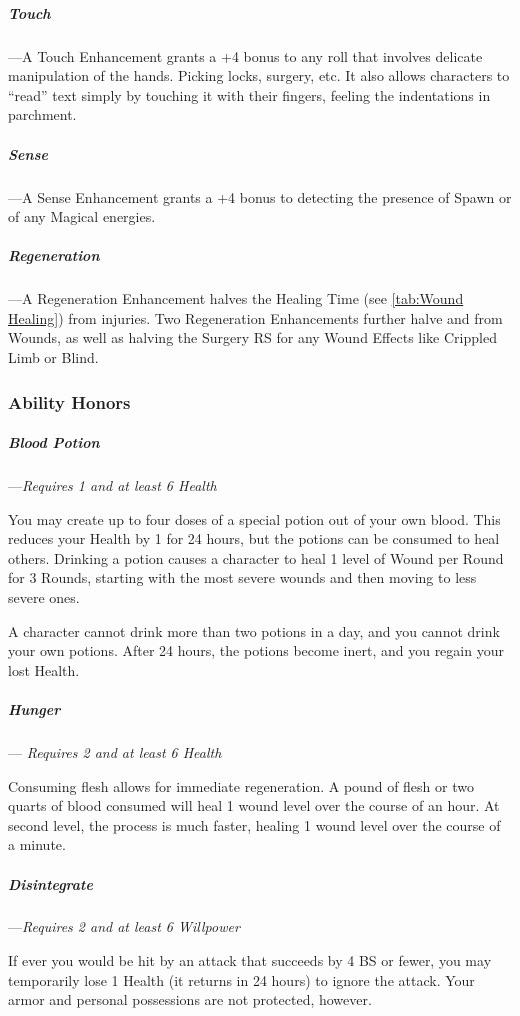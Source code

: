 \documentclass[oneside,11pt,english]{book}
\begin{document}
\subparagraph{Touch}\label{honor:Touch}
---\quad A Touch Enhancement grants a +4 bonus to any roll that involves delicate manipulation 
of the hands. Picking locks, surgery, etc. It also allows characters to “read” text simply by 
touching it with their fingers, feeling the indentations in parchment.

\subparagraph{Sense}\label{honor:Sense}
---\quad A Sense Enhancement grants a +4 bonus to detecting the presence of Spawn or of any 
Magical energies. 

\subparagraph{Regeneration}\label{honor:Regeneration}
---\quad A Regeneration Enhancement halves the Healing Time (see \autoref{tab:Wound Healing}) from injuries. Two 
Regeneration Enhancements further halve  and  from Wounds, as well as 
halving the Surgery RS for any Wound Effects like Crippled Limb or Blind.

\subsubsection{Ability Honors}
\subparagraph{Blood Potion}\label{honor:Blood Potion}
---\quad \emph{Requires  1 and at least 6 Health}

You may create up to four doses
of a special potion out of your own blood. This reduces your Health by 1 for 24 hours, but the 
potions can be consumed to heal others. Drinking a potion causes a character to heal 1 level of 
Wound per Round for 3 Rounds, starting with the most severe wounds and then moving to less 
severe ones. 

A character cannot drink more than two potions in a day, and you cannot drink your own 
potions. After 24 hours, the potions become inert, and you regain your lost Health. 

\subparagraph{Hunger}---\quad\label{honor:Hunger}
\emph{Requires  2 and at least 6 Health}

Consuming flesh allows for immediate regeneration. A pound of flesh or two
quarts of blood consumed will heal 1 wound level over the course of an hour. At
second level, the process is much faster, healing 1 wound level over the course
of a minute.

\subparagraph{Disintegrate}\label{honor:Disintegrate}
---\quad \emph{Requires  2 and at least 6 Willpower}

If ever you would be hit by an attack that succeeds by 4 BS or fewer, you may
temporarily lose 1 Health (it returns in 24 hours) to ignore the attack. Your
armor and personal possessions are not protected, however.
\end{document}
